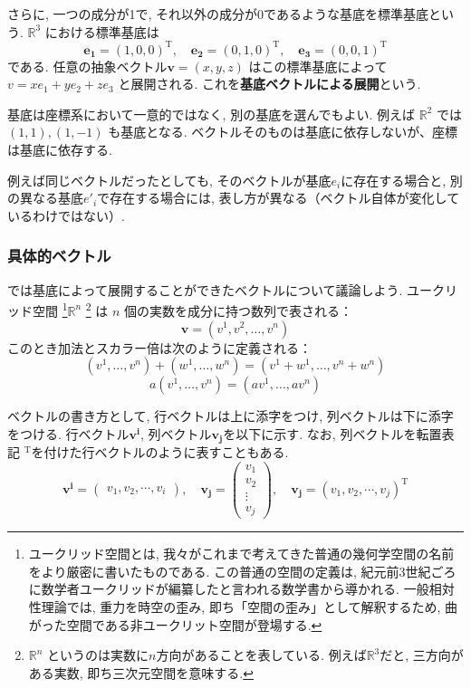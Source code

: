 \documentclass{ltjsarticle}
\begin{document}
さらに, 一つの成分が1で, それ以外の成分が0であるような基底を標準基底という. 
$\mathbb{R}^3$ における標準基底は
\[
\mathbf{e_1}=(1,0,0)^\mathrm{T}, \quad \mathbf{e_2}=(0,1,0)^\mathrm{T}, \quad \mathbf{e_3}=(0,0,1)^\mathrm{T}
\]
である. 任意の抽象ベクトル$\mathbf{v}=(x,y,z)$ はこの標準基底によって $v=x e_1+y e_2+z e_3$ と展開される. 
これを\textbf{基底ベクトルによる展開}という. 

基底は座標系において一意的ではなく, 別の基底を選んでもよい. 
例えば $\mathbb{R}^2$ では $(1,1),(1,-1)$ も基底となる. 
ベクトルそのものは基底に依存しないが、座標は基底に依存する. 

例えば同じベクトルだったとしても, そのベクトルが基底$e_i$に存在する場合と, 
別の異なる基底$e'_i$で存在する場合には, 表し方が異なる（ベクトル自体が変化しているわけではない）. 

\subsubsection{具体的ベクトル}
では基底によって展開することができたベクトルについて議論しよう. 
ユークリッド空間
\footnote{
    ユークリッド空間とは, 我々がこれまで考えてきた普通の幾何学空間の名前をより厳密に書いたものである. 
    この普通の空間の定義は, 紀元前3世紀ごろに数学者ユークリッドが編纂したと言われる数学書から導かれる. 
    一般相対性理論では, 重力を時空の歪み, 即ち「空間の歪み」として解釈するため, 曲がった空間である非ユークリット空間が登場する. 
}$\mathbb{R}^n$
\footnote{
    $\mathbb{R}^n$ というのは実数に$n$方向があることを表している. 
    例えば$\mathbb{R}^3$だと, 三方向がある実数, 即ち三次元空間を意味する. 
} は $n$ 個の実数を成分に持つ数列で表される：
\[
\mathbf{v} = (v^1, v^2, \dots, v^n)
\]
このとき加法とスカラー倍は次のように定義される：
\[
(v^1,\dots,v^n)+(w^1,\dots,w^n)=(v^1+w^1,\dots,v^n+w^n)
\]
\[
a(v^1,\dots,v^n)=(av^1,\dots,av^n)
\]

ベクトルの書き方として, 行ベクトルは上に添字をつけ, 列ベクトルは下に添字をつける. 
行ベクトル$\mathbf{v^{i}}$, 列ベクトル$\mathbf{v_j}$を以下に示す. 
なお, 列ベクトルを転置表記 $^\mathrm{T}$を付けた行ベクトルのように表すこともある. 
\[
\mathbf{v^{i}} =
\begin{pmatrix}
v_1 , v_2 , \cdots , v_i
\end{pmatrix},
\quad
\mathbf{v_j} =
\begin{pmatrix}
v_1 \\
v_2 \\
\vdots \\
v_j
\end{pmatrix},
\quad
\mathbf{v_j} = (v_1 , v_2 , \cdots , v_j)^\mathrm{T}
\]
\end{document}
